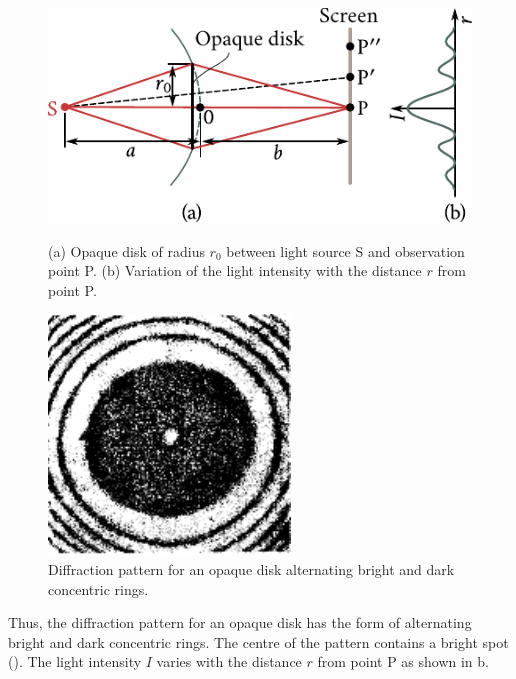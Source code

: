 \begin{figure}[!htb]
	\begin{minipage}[t]{0.6\linewidth}
		\begin{center}
			\includegraphics[scale=0.9]{figures/ch_18/fig_18_13.pdf}
            \caption[]{(a) Opaque disk of radius $r_0$ between light source S and observation point P. (b) Variation of the light intensity with the distance $r$ from point P.}
			\label{fig:18_13}
		\end{center}
	\end{minipage}
	\hfill{ }%
	\begin{minipage}[t]{0.34\linewidth}
		\begin{center}
			\includegraphics[scale=0.9]{figures/ch_18/fig_18_14.pdf}
			\caption[]{Diffraction pattern for an opaque disk alternating bright and dark concentric rings.}
			\label{fig:18_14}
		\end{center}
	\end{minipage}
\vspace{-0.4cm}
\end{figure}

Thus, the diffraction pattern for an opaque disk has the form of alternating bright and dark concentric rings.
The centre of the pattern contains a bright spot ().
The light intensity $I$ varies with the distance $r$ from point P as shown in b.

